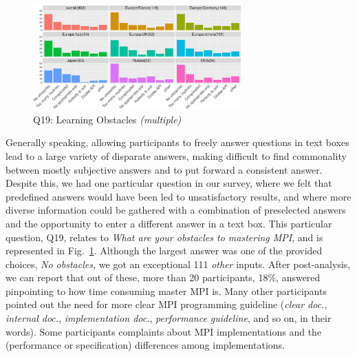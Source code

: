 \documentclass[preprint,5p,times]{elsarticle}
\def\myquote#1{{\it #1}}
\begin{document}
\begin{figure}[htb]
\begin{center}
\includegraphics[width=8.0cm]{R-scripts/Q19.pdf}
\vspace{-2mm}
\caption{Q19: Learning Obstacles {\it(multiple)}}
\label{fig:learning-obstacles}
\end{center}
\end{figure}

Generally speaking, allowing participants to freely answer questions in text
boxes lead to a large variety of disparate answers, making difficult to find
commonality between mostly subjective answers and to put forward a consistent
answer. Despite this, we had one particular question in our survey, where we
felt that predefined answers would have been led to unsatisfactory results, and
where more diverse information could be gathered with a combination of
preselected answers and the opportunity to enter a different answer in a text
box. This particular question, Q19, relates to \myquote{What are your obstacles
to mastering MPI}, and is represented in Fig.~\ref{fig:learning-obstacles}.
Although the largest answer was one of the provided choices, \myquote{No
obstacles,} we got an exceptional 111 \myquote{other} inputs.
After post-analysis, we can report that out of these, more than 20 participants,
18\%, answered pinpointing to how time consuming master MPI is. Many other
participants pointed out the need for more clear MPI programming guideline
(\myquote{clear doc.}, \myquote{internal doc.}, \myquote{implementation doc.},
\myquote{performance guideline}, and so on, in their words). Some participants
complaints about MPI implementations and the (performance or specification)
differences among implementations.
\end{document}
